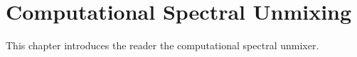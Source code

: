 \chapter{Computational Spectral Unmixing}\label{chap:Csu}

This chapter introduces the reader the computational spectral unmixer. 


%  
%



